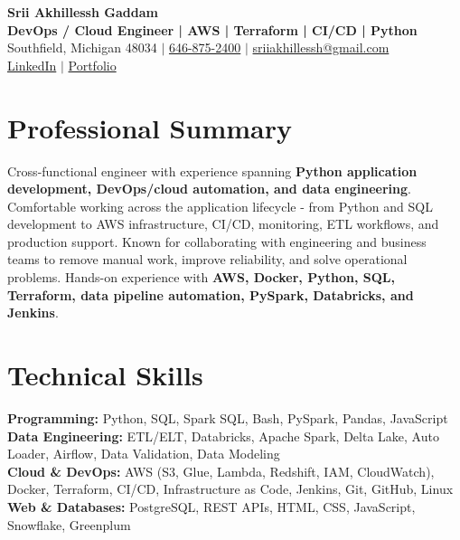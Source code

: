 \documentclass[letterpaper,10pt]{article}
\begin{document}
\fontsize{9.35pt}{10.45pt}\selectfont

\begin{center}
    {\LARGE \textbf{Srii Akhillessh Gaddam}} \\[-1pt]
    \textbf{DevOps / Cloud Engineer | AWS | Terraform | CI/CD | Python} \\[2pt]
    Southfield, Michigan 48034 $|$
    \href{tel:6468752400}{646-875-2400} $|$
    \href{mailto:sriiakhillessh@gmail.com}{sriiakhillessh@gmail.com} \\[1pt]
    \href{https://www.linkedin.com/in/srii-akhiilessh-gaddam-b48668191/}{LinkedIn} $|$
    \href{https://sriiakhillesshg.github.io/portfolio/}{Portfolio}
\end{center}
\vspace{-8pt}

\section{Professional Summary}
\small{Cross-functional engineer with experience spanning \textbf{Python application development, DevOps/cloud automation, and data engineering}. Comfortable working across the application lifecycle - from Python and SQL development to AWS infrastructure, CI/CD, monitoring, ETL workflows, and production support. Known for collaborating with engineering and business teams to remove manual work, improve reliability, and solve operational problems. Hands-on experience with \textbf{AWS, Docker, Python, SQL, Terraform, data pipeline automation, PySpark, Databricks, and Jenkins}.}

\section{Technical Skills}
\small{
\textbf{Programming:} Python, SQL, Spark SQL, Bash, PySpark, Pandas, JavaScript \\
\textbf{Data Engineering:} ETL/ELT, Databricks, Apache Spark, Delta Lake, Auto Loader, Airflow, Data Validation, Data Modeling \\
\textbf{Cloud \& DevOps:} AWS (S3, Glue, Lambda, Redshift, IAM, CloudWatch), Docker, Terraform, CI/CD, Infrastructure as Code, Jenkins, Git, GitHub, Linux \\
\textbf{Web \& Databases:} PostgreSQL, REST APIs, HTML, CSS, JavaScript, Snowflake, Greenplum
}
\end{document}
